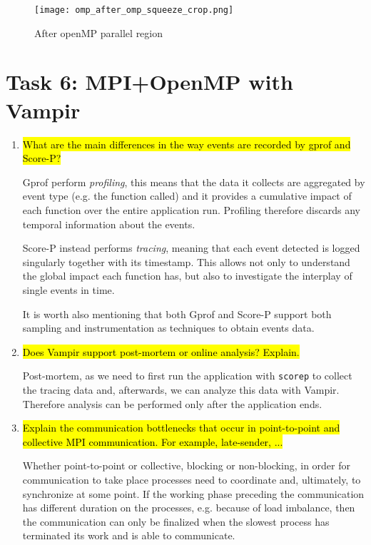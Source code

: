 \documentclass{article}
\begin{document}
\begin{figure}
    \begin{center}
        \texttt{[image: omp\_after\_omp\_squeeze\_crop.png]}
    \caption{After openMP parallel region}
    \label{fig:after_omp_region_hybrid}
    \end{center}
\end{figure}

\section{Task 6: MPI+OpenMP with Vampir}
\begin{enumerate}
	\item \hl{What are the main differences in the way events are recorded by gprof and Score-P?} ~

	Gprof perform \emph{profiling}, this means that the data it collects are aggregated by event type (e.g. the function called) and it provides a cumulative impact of each function over the entire application run. Profiling therefore discards any temporal information about the events.

	Score-P instead performs \emph{tracing}, meaning that each event detected is logged singularly together with its timestamp. This allows not only to understand the global impact each function has, but also to investigate the interplay of single events in time.

	It is worth also mentioning that both Gprof and Score-P support both sampling and instrumentation as techniques to obtain events data.

	\item \hl{Does Vampir support post-mortem or online analysis? Explain.} ~

	Post-mortem, as we need to first run the application with \verb!scorep! to collect the tracing data and, afterwards, we can analyze this data with Vampir. Therefore analysis can be performed only after the application ends.

	\item \hl{Explain the communication bottlenecks that occur in point-to-point and collective MPI communication. For example, late-sender, ...} ~

	Whether point-to-point or collective, blocking or non-blocking, in order for communication to take place processes need to coordinate and, ultimately, to synchronize at some point. If the working phase preceding the communication has different duration on the processes, e.g. because of load imbalance, then the communication can only be finalized when the slowest process has terminated its work and is able to communicate.


\end{enumerate}
\end{document}
